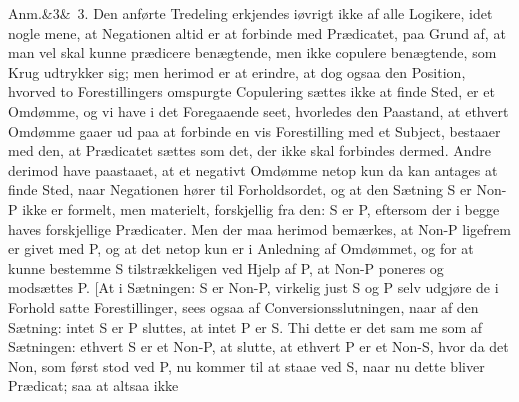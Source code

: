 \documentclass[12pt]{book}
\def\sperr#1{#1}%
\def\textit#1{#1}%
\def\emph#1{#1}%
\newcommand{\sperr}[1]{\textls[180]{#1}}
\newcommand{\anm}[1]{%
  \par\vspace{0.5\baselineskip}%
  \noindent\hspace{\parindent}\sperr{Anm.}\ifx&#1&\else~\textit{#1}.\fi
  \enspace\ignorespaces
}
\newcommand{\opage}[1]{\marginnote{\footnotesize\textit{[#1]}}}
\begin{document}
\anm{3} Den anførte Tredeling erkjendes iøvrigt ikke af alle Logikere, idet nogle mene, at
Negationen altid er at forbinde med Prædicatet, paa Grund af, at man vel skal kunne
prædicere benægtende, men ikke copulere benægtende, som \emph{Krug} udtrykker sig; men
herimod er at erindre, at dog ogsaa den Position, hvorved to Forestillingers omspurgte
Copulering sættes ikke at finde Sted, er et Omdømme, og vi have i det Foregaaende seet,
hvorledes den Paastand, at ethvert Omdømme gaaer ud paa at forbinde en vis Forestilling med
et Subject, bestaaer med den, at Prædicatet sættes som det, der ikke skal forbindes dermed.
Andre derimod have paastaaet, at et negativt Omdømme netop kun da kan antages at finde
Sted, naar Negationen hører til Forholdsordet, og at den Sætning \textit{S} er
\textit{Non-P} ikke er formelt, men materielt, forskjellig fra den: \textit{S} er
\textit{P}, eftersom der i begge haves forskjellige Prædicater. Men der maa herimod
bemærkes, at \textit{Non-P} ligefrem er givet med \textit{P}, og at det netop kun er i
Anledning af Omdømmet, og for at kunne bestemme \textit{S} tilstrækkeligen ved Hjelp af
\textit{P}, at \textit{Non-P} poneres og modsættes \textit{P}. [At i Sætningen: \textit{S}
er \textit{Non-P}, virkelig just \textit{S} og \textit{P} selv udgjøre de i Forhold satte
Forestillinger, sees ogsaa af Conversionsslutningen, naar af den Sætning: intet \textit{S}
er \textit{P} sluttes, at intet \textit{P} er \textit{S}. Thi dette er det sam%
\opage{275}me som af Sætningen: ethvert \textit{S} er et \textit{Non-P}, at slutte, at ethvert
\textit{P} er et \textit{Non-S}, hvor da det \textit{Non}, som først stod ved \textit{P},
nu kommer til at staae ved \textit{S}, naar nu dette bliver Prædicat; saa at altsaa ikke
\end{document}
